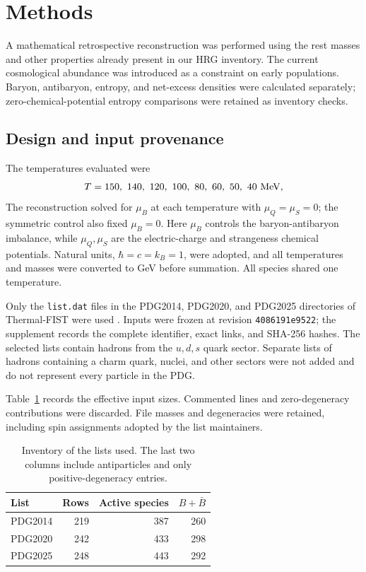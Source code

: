 \section{Methods}
A mathematical retrospective reconstruction was performed using the rest masses and other properties already present in our HRG inventory. The current cosmological abundance was introduced as a constraint on early populations. Baryon, antibaryon, entropy, and net-excess densities were calculated separately; zero-chemical-potential entropy comparisons were retained as inventory checks.
\subsection{Design and input provenance}
The temperatures evaluated were
\[
T=150,\ 140,\ 120,\ 100,\ 80,\ 60,\ 50,\ 40\ {\rm MeV},
\]
The reconstruction solved for $\mu_B$ at each temperature with $\mu_Q=\mu_S=0$; the symmetric control also fixed $\mu_B=0$. Here $\mu_B$ controls the baryon-antibaryon imbalance, while $\mu_Q,\mu_S$ are the electric-charge and strangeness chemical potentials. Natural units, $\hbar=c=k_B=1$, were adopted, and all temperatures and masses were converted to GeV before summation. All species shared one temperature.

Only the \texttt{list.dat} files in the PDG2014, PDG2020, and PDG2025 directories of Thermal-FIST were used \citep{TFLists2026}. Inputs were frozen at revision \texttt{4086191e9522}; the supplement records the complete identifier, exact links, and SHA-256 hashes. The selected lists contain hadrons from the $u,d,s$ quark sector. Separate lists of hadrons containing a charm quark, nuclei, and other sectors were not added and do not represent every particle in the PDG.

Table~\ref{tab:inventory} records the effective input sizes. Commented lines and zero-degeneracy contributions were discarded. File masses and degeneracies were retained, including spin assignments adopted by the list maintainers.

\begin{table}[t]
\centering\small
\caption{Inventory of the lists used. The last two columns include antiparticles and only positive-degeneracy entries.}
\label{tab:inventory}
\setlength{\tabcolsep}{3.6pt}
\begin{tabular}{lrrr}\toprule
List & Rows & Active species & $B+\bar B$\\\midrule
PDG2014 & 219 & 387 & 260\\
PDG2020 & 242 & 433 & 298\\
PDG2025 & 248 & 443 & 292\\
\bottomrule\end{tabular}
\end{table}

